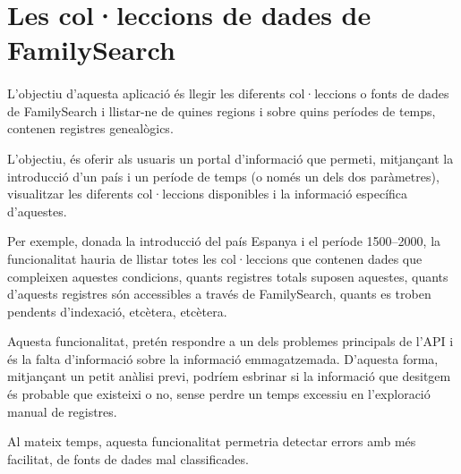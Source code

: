 \section{Les col·leccions de dades de FamilySearch}

    \paragraph{}
    L'objectiu d'aquesta aplicació és llegir les diferents col·leccions o fonts de dades de FamilySearch i llistar-ne de quines regions i sobre quins períodes de temps, contenen registres genealògics.

    L'objectiu, és oferir als usuaris un portal d'informació que permeti, mitjançant la introducció d'un país i un període de temps (o només un dels dos paràmetres), visualitzar les diferents col·leccions disponibles i la informació específica d'aquestes.

    Per exemple, donada la introducció del país Espanya i el període 1500--2000, la funcionalitat hauria de llistar totes les col·leccions que contenen dades que compleixen aquestes condicions, quants registres totals suposen aquestes, quants d'aquests registres són accessibles a través de FamilySearch, quants es troben pendents d'indexació, etcètera, etcètera.

    Aquesta funcionalitat, pretén respondre a un dels problemes principals de l'API i és la falta d'informació sobre la informació emmagatzemada. D'aquesta forma, mitjançant un petit anàlisi previ, podríem esbrinar si la informació que desitgem és probable que existeixi o no, sense perdre un temps excessiu en l'exploració manual de registres.

    Al mateix temps, aquesta funcionalitat permetria detectar errors amb més fa\-ci\-li\-tat, de fonts de dades mal classificades.
